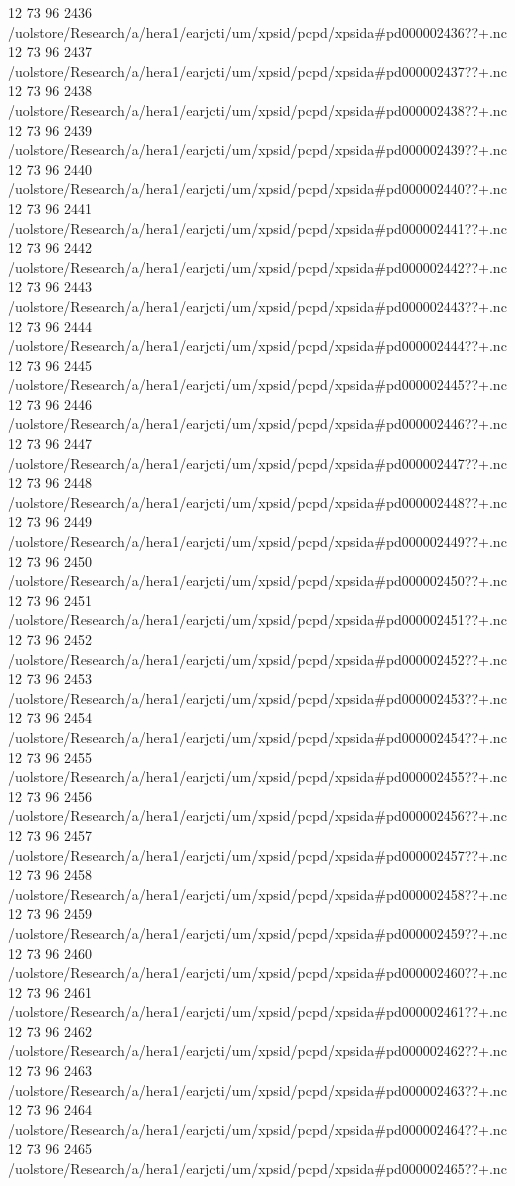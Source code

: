 12 73 96
2436
/uolstore/Research/a/hera1/earjcti/um/xpsid/pcpd/xpsida#pd000002436??+.nc
12 73 96
2437
/uolstore/Research/a/hera1/earjcti/um/xpsid/pcpd/xpsida#pd000002437??+.nc
12 73 96
2438
/uolstore/Research/a/hera1/earjcti/um/xpsid/pcpd/xpsida#pd000002438??+.nc
12 73 96
2439
/uolstore/Research/a/hera1/earjcti/um/xpsid/pcpd/xpsida#pd000002439??+.nc
12 73 96
2440
/uolstore/Research/a/hera1/earjcti/um/xpsid/pcpd/xpsida#pd000002440??+.nc
12 73 96
2441
/uolstore/Research/a/hera1/earjcti/um/xpsid/pcpd/xpsida#pd000002441??+.nc
12 73 96
2442
/uolstore/Research/a/hera1/earjcti/um/xpsid/pcpd/xpsida#pd000002442??+.nc
12 73 96
2443
/uolstore/Research/a/hera1/earjcti/um/xpsid/pcpd/xpsida#pd000002443??+.nc
12 73 96
2444
/uolstore/Research/a/hera1/earjcti/um/xpsid/pcpd/xpsida#pd000002444??+.nc
12 73 96
2445
/uolstore/Research/a/hera1/earjcti/um/xpsid/pcpd/xpsida#pd000002445??+.nc
12 73 96
2446
/uolstore/Research/a/hera1/earjcti/um/xpsid/pcpd/xpsida#pd000002446??+.nc
12 73 96
2447
/uolstore/Research/a/hera1/earjcti/um/xpsid/pcpd/xpsida#pd000002447??+.nc
12 73 96
2448
/uolstore/Research/a/hera1/earjcti/um/xpsid/pcpd/xpsida#pd000002448??+.nc
12 73 96
2449
/uolstore/Research/a/hera1/earjcti/um/xpsid/pcpd/xpsida#pd000002449??+.nc
12 73 96
2450
/uolstore/Research/a/hera1/earjcti/um/xpsid/pcpd/xpsida#pd000002450??+.nc
12 73 96
2451
/uolstore/Research/a/hera1/earjcti/um/xpsid/pcpd/xpsida#pd000002451??+.nc
12 73 96
2452
/uolstore/Research/a/hera1/earjcti/um/xpsid/pcpd/xpsida#pd000002452??+.nc
12 73 96
2453
/uolstore/Research/a/hera1/earjcti/um/xpsid/pcpd/xpsida#pd000002453??+.nc
12 73 96
2454
/uolstore/Research/a/hera1/earjcti/um/xpsid/pcpd/xpsida#pd000002454??+.nc
12 73 96
2455
/uolstore/Research/a/hera1/earjcti/um/xpsid/pcpd/xpsida#pd000002455??+.nc
12 73 96
2456
/uolstore/Research/a/hera1/earjcti/um/xpsid/pcpd/xpsida#pd000002456??+.nc
12 73 96
2457
/uolstore/Research/a/hera1/earjcti/um/xpsid/pcpd/xpsida#pd000002457??+.nc
12 73 96
2458
/uolstore/Research/a/hera1/earjcti/um/xpsid/pcpd/xpsida#pd000002458??+.nc
12 73 96
2459
/uolstore/Research/a/hera1/earjcti/um/xpsid/pcpd/xpsida#pd000002459??+.nc
12 73 96
2460
/uolstore/Research/a/hera1/earjcti/um/xpsid/pcpd/xpsida#pd000002460??+.nc
12 73 96
2461
/uolstore/Research/a/hera1/earjcti/um/xpsid/pcpd/xpsida#pd000002461??+.nc
12 73 96
2462
/uolstore/Research/a/hera1/earjcti/um/xpsid/pcpd/xpsida#pd000002462??+.nc
12 73 96
2463
/uolstore/Research/a/hera1/earjcti/um/xpsid/pcpd/xpsida#pd000002463??+.nc
12 73 96
2464
/uolstore/Research/a/hera1/earjcti/um/xpsid/pcpd/xpsida#pd000002464??+.nc
12 73 96
2465
/uolstore/Research/a/hera1/earjcti/um/xpsid/pcpd/xpsida#pd000002465??+.nc
